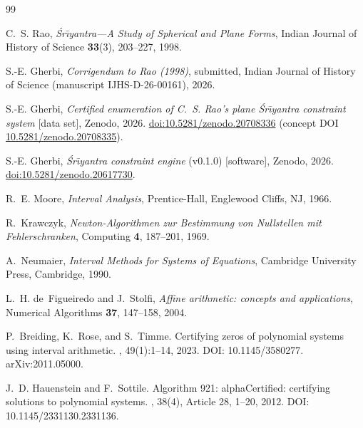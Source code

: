 \documentclass[11pt]{article}
\newcommand{\sri}{\'Sr\={\i}yantra}
\begin{document}
\begin{thebibliography}{99}

C.~S. Rao,
\newblock \emph{\sri{}---A Study of Spherical and Plane Forms},
\newblock Indian Journal of History of Science \textbf{33}(3), 203--227, 1998.

S.-E. Gherbi,
\newblock \emph{Corrigendum to Rao (1998)},
\newblock submitted, Indian Journal of History of Science (manuscript IJHS-D-26-00161), 2026.

S.-E. Gherbi,
\newblock \emph{Certified enumeration of C.~S. Rao's plane \sri{} constraint system}
[data set],
\newblock Zenodo, 2026. \href{https://doi.org/10.5281/zenodo.20708336}{doi:10.5281/zenodo.20708336}
(concept DOI \href{https://doi.org/10.5281/zenodo.20708335}{10.5281/zenodo.20708335}).

S.-E. Gherbi,
\newblock \emph{\sri{} constraint engine} (v0.1.0) [software],
\newblock Zenodo, 2026. \href{https://doi.org/10.5281/zenodo.20617730}{doi:10.5281/zenodo.20617730}.

R.~E. Moore,
\newblock \emph{Interval Analysis},
\newblock Prentice-Hall, Englewood Cliffs, NJ, 1966.

R.~Krawczyk,
\newblock \emph{{N}ewton-Algorithmen zur Bestimmung von Nullstellen mit Fehlerschranken},
\newblock Computing \textbf{4}, 187--201, 1969.

A.~Neumaier,
\newblock \emph{Interval Methods for Systems of Equations},
\newblock Cambridge University Press, Cambridge, 1990.

L.~H. de~Figueiredo and J.~Stolfi,
\newblock \emph{Affine arithmetic: concepts and applications},
\newblock Numerical Algorithms \textbf{37}, 147--158, 2004.

P.~Breiding, K.~Rose, and S.~Timme.
\newblock Certifying zeros of polynomial systems using interval arithmetic.
, 49(1):1--14, 2023.
\newblock DOI: 10.1145/3580277. arXiv:2011.05000.

J.~D. Hauenstein and F.~Sottile.
\newblock Algorithm 921: {alphaCertified}: certifying solutions to polynomial systems.
, 38(4), Article 28, 1--20, 2012.
\newblock DOI: 10.1145/2331130.2331136.

\end{thebibliography}
\end{document}
